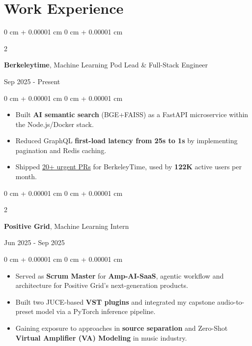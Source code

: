 \documentclass[10pt, letterpaper]{article}
\newenvironment{highlights}{
    \begin{itemize}[
        topsep=0.10 cm,
        parsep=0.10 cm,
        partopsep=0pt,
        itemsep=0pt,
        leftmargin=0 cm + 10pt
    ]
}{
    \end{itemize}
} %
\newenvironment{onecolentry}{
    \begin{adjustwidth}{
        0 cm + 0.00001 cm
    }{
        0 cm + 0.00001 cm
    }
}{
    \end{adjustwidth}
} %
\newenvironment{twocolentry}[2][]{
    \onecolentry
    \def\secondColumn{#2}
    \setcolumnwidth{\fill, 5.2 cm}
    \begin{paracol}{2}
}{
    \switchcolumn \raggedleft \secondColumn
    \end{paracol}
    \endonecolentry
} %
\begin{document}
    \section{Work Experience}

    \begin{twocolentry}{
        Sep 2025 - Present
    }
        \textbf{Berkeleytime}, Machine Learning Pod Lead \& Full-Stack Engineer
    \end{twocolentry}
    
    \vspace{0.10 cm}
    \begin{onecolentry}
        \begin{highlights}
            \item Built \textbf{AI semantic search} (BGE+FAISS) as a FastAPI microservice within the Node.js/Docker stack.
            \item Reduced GraphQL \textbf{first-load latency from 25s to 1s} by implementing pagination and Redis caching.
            \item Shipped \href{https://github.com/asuc-octo/berkeleytime/pulls?q=author%3Avaclisinc}{20+ urgent PRs} for BerkeleyTime, used by \textbf{122K} active users per month.
        \end{highlights}
    \end{onecolentry}

    \vspace{0.2 cm}
    
    \begin{twocolentry}{
        Jun 2025 - Sep 2025
    }
        \textbf{Positive Grid}, Machine Learning Intern
    \end{twocolentry}
    
    \vspace{0.10 cm}
    \begin{onecolentry}
        \begin{highlights}
            \item Served as \textbf{Scrum Master} for \textbf{Amp-AI-SaaS}, agentic workflow and architecture for Positive Grid’s next-generation products.
            \item Built two JUCE-based \textbf{VST plugins} and integrated my capstone audio-to-preset model via a PyTorch inference pipeline.
            \item Gaining exposure to approaches in \textbf{source separation} and Zero-Shot \textbf{Virtual Amplifier (VA) Modeling} in music industry.
        \end{highlights}
    \end{onecolentry}
    
\end{document}
